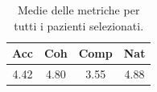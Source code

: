 
\begin{table}[!h]
\centering
\begin{tabular}{||c c c c||}
\hline
Acc & Coh & Comp & Nat \\ [0.5ex]
\hline\hline
4.42 & 4.80 & 3.55 & 4.88 \\
\hline
\end{tabular}
\caption{Medie delle metriche per tutti i pazienti selezionati.}
\label{tab:metriche_finali_pazienti}
\end{table}
